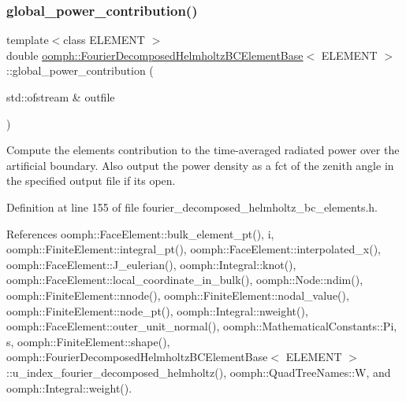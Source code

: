 \subsubsection{\texorpdfstring{global\+\_\+power\+\_\+contribution()}{global\_power\_contribution()}\hspace{0.1cm}{\footnotesize\ttfamily [2/2]}}
{\footnotesize\ttfamily template$<$class E\+L\+E\+M\+E\+NT $>$ \\
double \hyperlink{classoomph_1_1FourierDecomposedHelmholtzBCElementBase}{oomph\+::\+Fourier\+Decomposed\+Helmholtz\+B\+C\+Element\+Base}$<$ E\+L\+E\+M\+E\+NT $>$\+::global\+\_\+power\+\_\+contribution (\begin{DoxyParamCaption}\item[{std\+::ofstream \&}]{outfile }\end{DoxyParamCaption})\hspace{0.3cm}{\ttfamily [inline]}}



Compute the element\textquotesingle{}s contribution to the time-\/averaged radiated power over the artificial boundary. Also output the power density as a fct of the zenith angle in the specified output file if it\textquotesingle{}s open. 



Definition at line 155 of file fourier\+\_\+decomposed\+\_\+helmholtz\+\_\+bc\+\_\+elements.\+h.



References oomph\+::\+Face\+Element\+::bulk\+\_\+element\+\_\+pt(), i, oomph\+::\+Finite\+Element\+::integral\+\_\+pt(), oomph\+::\+Face\+Element\+::interpolated\+\_\+x(), oomph\+::\+Face\+Element\+::\+J\+\_\+eulerian(), oomph\+::\+Integral\+::knot(), oomph\+::\+Face\+Element\+::local\+\_\+coordinate\+\_\+in\+\_\+bulk(), oomph\+::\+Node\+::ndim(), oomph\+::\+Finite\+Element\+::nnode(), oomph\+::\+Finite\+Element\+::nodal\+\_\+value(), oomph\+::\+Finite\+Element\+::node\+\_\+pt(), oomph\+::\+Integral\+::nweight(), oomph\+::\+Face\+Element\+::outer\+\_\+unit\+\_\+normal(), oomph\+::\+Mathematical\+Constants\+::\+Pi, s, oomph\+::\+Finite\+Element\+::shape(), oomph\+::\+Fourier\+Decomposed\+Helmholtz\+B\+C\+Element\+Base$<$ E\+L\+E\+M\+E\+N\+T $>$\+::u\+\_\+index\+\_\+fourier\+\_\+decomposed\+\_\+helmholtz(), oomph\+::\+Quad\+Tree\+Names\+::W, and oomph\+::\+Integral\+::weight().

\mbox{\label{classoomph_1_1FourierDecomposedHelmholtzBCElementBase_a17070cafb0b4d23fb736b022f7d9d36b}} 
